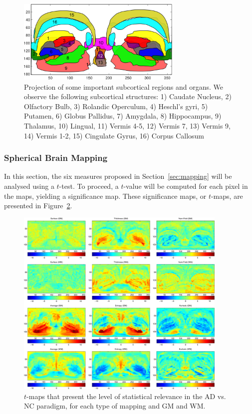 \begin{figure}[htp]
	\centering
	\includegraphics[width=0.7\textwidth]{gfx/ch6/06-regions_subcortical}
	
	\caption{Projection of some important subcortical regions and organs. We observe the following subcortical structures: 1) Caudate Nucleus, 2) Olfactory Bulb, 3) Rolandic Operculum, 4) Heschl's gyri, 5) Putamen, 6) Globus Pallidus, 7) Amygdala, 8) Hippocampus, 9) Thalamus, 10) Lingual, 11) Vermis 4-5, 12) Vermis 7, 13) Vermis 9, 14) Vermis 1-2, 15) Cingulate Gyrus, 16) Corpus Callosum}
	\label{fig:regionsSub}
\end{figure}

\subsubsection{Spherical Brain Mapping}\label{sec:sbmttest}
In this section, the six measures proposed in Section~\ref{sec:mapping} will be analysed using a $t$-test. To proceed, a $t$-value will be computed for each pixel in the maps, yielding a significance map. These significance maps, or $t$-maps, are presented in Figure~\ref{fig:tmaps}. 

\begin{figure}[htp]
	\centering
	\includegraphics[width=0.9\textwidth]{gfx/ch6/07-tmaps}
	\caption{$t$-maps that present the level of statistical relevance in the AD vs. NC paradigm, for each type of mapping and \ac{GM} and \ac{WM}. }
	\label{fig:tmaps}
\end{figure}

